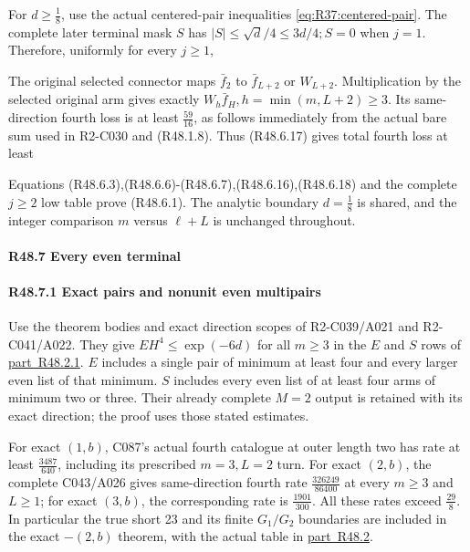 For \(d\ge \frac{1}{8}\), use the actual centered-pair inequalities \eqref{eq:R37:centered-pair}. The complete later terminal mask \(S\) has \(\lvert S\rvert \le \sqrt{d}/4\le 3d/4; S=0\) when \(j=1\). Therefore, uniformly for every \(j\ge 1\),


The original selected connector maps \(\bar f_{2}\) to \(\bar f_{L+2}\) or \(W_{L+2}\). Multiplication by the selected original arm gives exactly \(W_h \bar f_H,\allowbreak \allowbreak  h=\min(m,\allowbreak \allowbreak L+2)\ge 3\). Its same-direction fourth loss is at least \(\frac{59}{16}\), as follows immediately from the actual bare sum used in R2-C030 and (R48.1.8). Thus (R48.6.17) gives total fourth loss at least


Equations (R48.6.3),(R48.6.6)-(R48.6.7),(R48.6.16),(R48.6.18) and the complete \(j\ge 2\) low table prove (R48.6.1). The analytic boundary \(d=\frac{1}{8}\) is shared, and the integer comparison \(m\) versus \(\ell+L\) is unchanged throughout.

\paragraph{R48.7 Every even terminal}

\paragraph{R48.7.1 Exact pairs and nonunit even multipairs}

Use the theorem bodies and exact direction scopes of R2-C039/A021 and R2-C041/A022. They give \(EH^4\le \exp(-6d)\) for all \(m\ge 3\) in the \(E\) and \(S\) rows of \mbox{\hyperref[part:R48.2.1]{part R48.2.1}}. \(E\) includes a single pair of minimum at least four and every larger even list of that minimum. \(S\) includes every even list of at least four arms of minimum two or three. Their already complete \(M=2\) output is retained with its exact direction; the proof uses those stated estimates.

For exact \((1,\allowbreak \allowbreak b)\), C087's actual fourth catalogue at outer length two has rate at least \(\frac{3487}{640}\), including its prescribed \(m=3,\allowbreak \allowbreak L=2\) turn. For exact \((2,\allowbreak \allowbreak b)\), the complete C043/A026 gives same-direction fourth rate \(\frac{326249}{86400}\) at every \(m\ge 3\) and \(L\ge 1\); for exact \((3,\allowbreak \allowbreak b)\), the corresponding rate is \(\frac{1901}{300}\). All these rates exceed \(\frac{29}{8}\). In particular the true short 23 and its finite \(G_{1}/G_{2}\) boundaries are included in the exact \(-(2,\allowbreak \allowbreak b)\) theorem, with the actual table in \mbox{\hyperref[part:R48.2]{part R48.2}}.

